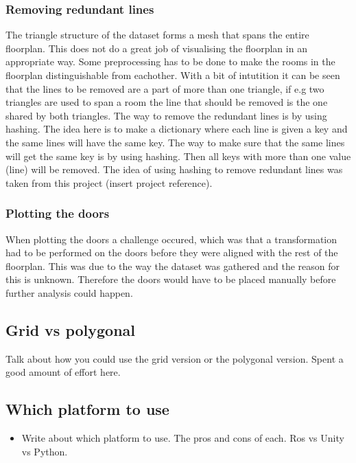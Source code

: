 \subsubsection{Removing redundant lines}
The triangle structure of the dataset forms a mesh that spans the entire floorplan. This does not do a great job of visualising the floorplan in an appropriate way. Some preprocessing has to be done to make the rooms in the floorplan distinguishable from eachother. With a bit of intutition it can be seen that the lines to be removed are a part of more than one triangle, if e.g two triangles are used to span a room the line that should be removed is the one shared by both triangles. The way to remove the redundant lines is by using hashing. The idea here is to make a dictionary where each line is given a key and the same lines will have the same key. The way to make sure that the same lines will get the same key is by using hashing. Then all keys with more than one value (line) will be removed. The idea of using hashing to remove redundant lines was taken from this project (insert project reference).

\subsubsection{Plotting the doors}
When plotting the doors a challenge occured, which was that a transformation had to be performed on the doors before they were aligned with the rest of the floorplan. 
This was due to the way the dataset was gathered and the reason for this is unknown. 
Therefore the doors would have to be placed manually before further analysis could happen.



\subsection{Grid vs polygonal}

Talk about how you could use the grid version or the polygonal version. Spent a good amount of effort here.

\subsection{Which platform to use}
\begin{itemize}
    \item Write about which platform to use. The pros and cons of each. Ros vs Unity vs Python.
\end{itemize}



